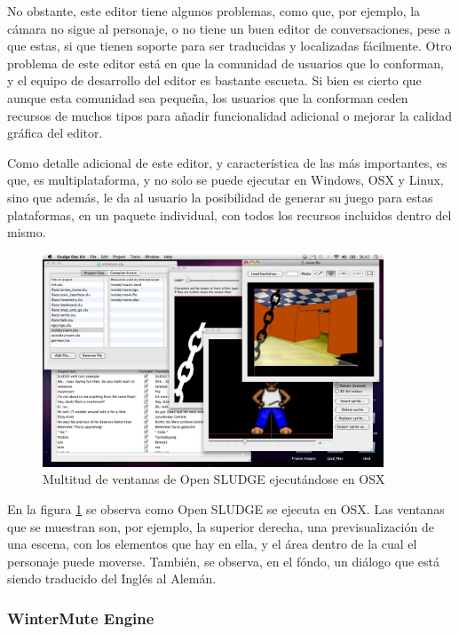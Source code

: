 No obstante, este editor tiene algunos problemas, como que, por ejemplo, la cámara no sigue al personaje, o no tiene un buen editor de conversaciones, pese a que estas, si que tienen soporte para ser traducidas y localizadas fácilmente. Otro problema de este editor está en que la comunidad de usuarios que lo conforman, y el equipo de desarrollo del editor es bastante escueta. Si bien es cierto que aunque esta comunidad sea pequeña, los usuarios que la conforman ceden recursos de muchos tipos para añadir funcionalidad adicional o mejorar la calidad gráfica del editor.

Como detalle adicional de este editor, y característica de las más importantes, es que, es multiplataforma, y no solo se puede ejecutar en Windows, OSX y Linux, sino que además, le da al usuario la posibilidad de generar su juego para estas plataformas, en un paquete individual, con todos los recursos incluidos dentro del mismo.

\begin{figure}[htb]
	\includegraphics[height=2.5in]{figures/sludge.png}
	\caption[Open SLUDGE]{Multitud de ventanas de Open SLUDGE ejecutándose en OSX}
	\label{sludgefigure}
\end{figure}

En la figura \ref{sludgefigure} se observa como Open SLUDGE se ejecuta en OSX. Las ventanas que se muestran son, por ejemplo, la superior derecha, una previsualización de una escena, con los elementos que hay en ella, y el área dentro de la cual el personaje puede moverse. También, se observa, en el fóndo, un diálogo que está siendo traducido del Inglés al Alemán.

\subsubsection{WinterMute Engine}
\label{wintermute}

